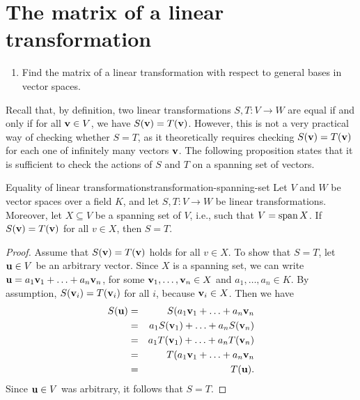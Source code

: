 \section{The matrix of a linear transformation}

\begin{outcome}
  \begin{enumerate}
  \item Find the matrix of a linear transformation with respect to
    general bases in vector spaces.
  \end{enumerate}
\end{outcome}

Recall that, by definition, two linear transformations $S,T:V\to W$
are equal if and only if for all $\mbox{\bf v}\in V$, we have
$S(\mbox{\bf v}) = T(\mbox{\bf v})$.  However, this is not a very practical
way of checking whether $S=T$, as it theoretically requires checking
$S(\mbox{\bf v}) = T(\mbox{\bf v})$ for each one of infinitely many vectors
$\mbox{\bf v}$. The following proposition states that it is sufficient to
check the actions of $S$ and $T$ on a spanning set of vectors.

\begin{proposition}{Equality of linear transformations}{transformation-spanning-set}
  Let $V$ and $W$ be vector spaces over a field $K$, and let
  $S,T:V\to W$ be linear transformations. Moreover, let $X\subseteq V$
  be a spanning set of $V$, i.e., such that $V=\sspan X$.
  If $S(\mbox{\bf v}) = T(\mbox{\bf v})$ for all $v\in X$, then $S=T$.%
\end{proposition}

\begin{proof}
  Assume that $S(\mbox{\bf v}) = T(\mbox{\bf v})$ holds for all $v\in X$. To
  show that $S=T$, let $\mbox{\bf u}\in V$ be an arbitrary vector. Since
  $X$ is a spanning set, we can write
  $\mbox{\bf u}=a_1\mbox{\bf v}_1+\ldots+a_n\mbox{\bf v}_n$, for some
  $\mbox{\bf v}_1,\ldots,\mbox{\bf v}_n\in X$ and $a_1,\ldots,a_n\in K$.
  By assumption, $S(\mbox{\bf v}_i) = T(\mbox{\bf v}_i)$ for all $i$, because
  $\mbox{\bf v}_i\in X$. Then we have
  \begin{eqnarray*}
    S(\mbox{\bf u})
    &=& S(a_1\mbox{\bf v}_1+\ldots+a_n\mbox{\bf v}_n \\
    &=& a_1S(\mbox{\bf v}_1)+\ldots+a_nS(\mbox{\bf v}_n) \\
    &=& a_1T(\mbox{\bf v}_1)+\ldots+a_nT(\mbox{\bf v}_n) \\
    &=& T(a_1\mbox{\bf v}_1+\ldots+a_n\mbox{\bf v}_n \\
    &=& T(\mbox{\bf u}).
  \end{eqnarray*}
  Since $\mbox{\bf u}\in V$ was arbitrary, it follows that $S=T$.
\end{proof}

